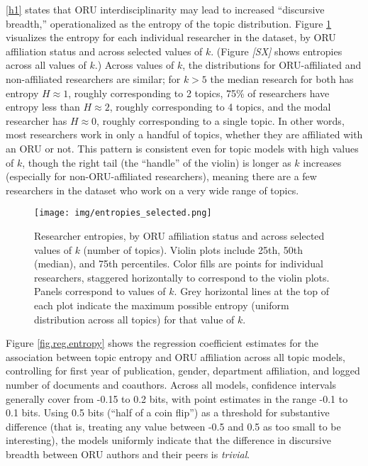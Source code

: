 \documentclass[
  11pt,
]{article}
\begin{document}
\ref{h1} states that ORU interdisciplinarity may lead to increased ``discursive breadth,'' operationalized as the entropy of the topic distribution. Figure \ref{fig.entropies} visualizes the entropy for each individual researcher in the dataset, by ORU affiliation status and across selected values of \(k\). (Figure \emph{{[}SX{]}} shows entropies across all values of \(k\).) Across values of \(k\), the distributions for ORU-affiliated and non-affiliated researchers are similar; for \(k>5\) the median research for both has entropy \(H \approx 1\), roughly corresponding to 2 topics, 75\% of researchers have entropy less than \(H \approx 2\), roughly corresponding to 4 topics, and the modal researcher has \(H \approx 0\), roughly corresponding to a single topic. In other words, most researchers work in only a handful of topics, whether they are affiliated with an ORU or not. This pattern is consistent even for topic models with high values of \(k\), though the right tail (the ``handle'' of the violin) is longer as \(k\) increases (especially for non-ORU-affiliated researchers), meaning there are a few researchers in the dataset who work on a very wide range of topics.

\begin{figure}
\centering
\texttt{[image: img/entropies\_selected.png]}
\caption{Researcher entropies, by ORU affiliation status and across selected values of \(k\) (number of topics). Violin plots include 25th, 50th (median), and 75th percentiles. Color fills are points for individual researchers, staggered horizontally to correspond to the violin plots. Panels correspond to values of \(k\). Grey horizontal lines at the top of each plot indicate the maximum possible entropy (uniform distribution across all topics) for that value of \(k\). \label{fig.entropies}}
\end{figure}

Figure \ref{fig.reg.entropy} shows the regression coefficient estimates for the association between topic entropy and ORU affiliation across all topic models, controlling for first year of publication, gender, department affiliation, and logged number of documents and coauthors. Across all models, confidence intervals generally cover from -0.15 to 0.2 bits, with point estimates in the range -0.1 to 0.1 bits. Using 0.5 bits (``half of a coin flip'') as a threshold for substantive difference (that is, treating any value between -0.5 and 0.5 as too small to be interesting), the models uniformly indicate that the difference in discursive breadth between ORU authors and their peers is \emph{trivial}.
\end{document}
